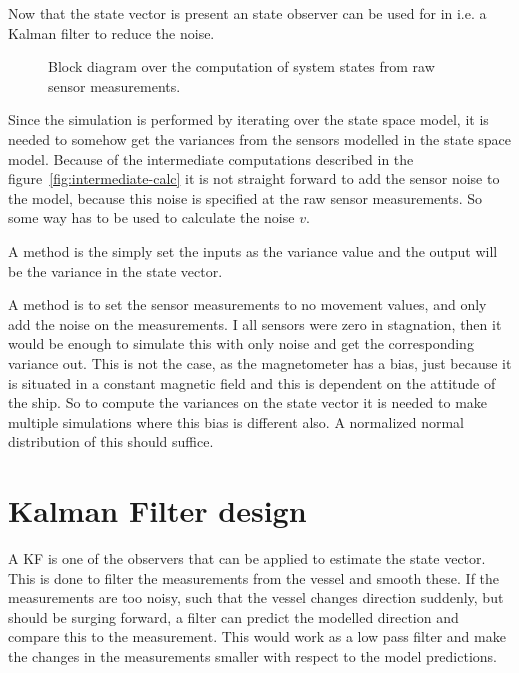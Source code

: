 Now that the state vector is present an state observer can be used for
in i.e. a Kalman filter to reduce the noise.

\begin{figure}
	\centering
	
	\caption{Block diagram over the computation of system states from
	raw sensor measurements.}
	\label{fig:intermediate-calc}
\end{figure}

Since the simulation is performed by iterating over the state space
model, it is needed to somehow get the variances from the sensors
modelled in the state space model. Because of the intermediate
computations described in the figure~\vref{fig:intermediate-calc} it
is not straight forward to add the sensor noise to the model, because
this noise is specified at the raw sensor measurements. So some way
has to be used to calculate the noise $v$.

A method is the simply set the inputs as the variance value and the
output will be the variance in the state vector. 

A method is to set the sensor measurements to no movement values, and
only add the noise on the measurements. I all sensors were zero in
stagnation, then it would be enough to simulate this with only noise and
get the corresponding variance out. This is not the case, as the
magnetometer has a bias, just because it is situated in a constant
magnetic field and this is dependent on the attitude of the ship. So
to compute the variances on the state vector it is needed to make
multiple simulations where this bias is different also. A normalized
normal distribution of this should suffice. 

\section{Kalman Filter design}

A \ac{KF} is one of the observers that can be applied to estimate the state vector. This is done to filter the measurements from the vessel and smooth these. If the measurements are too noisy, such that the vessel changes direction suddenly, but should be surging forward, a filter can predict the modelled direction and compare this to the measurement. This would work as a low pass filter and make the changes in the measurements smaller with respect to the model predictions.

